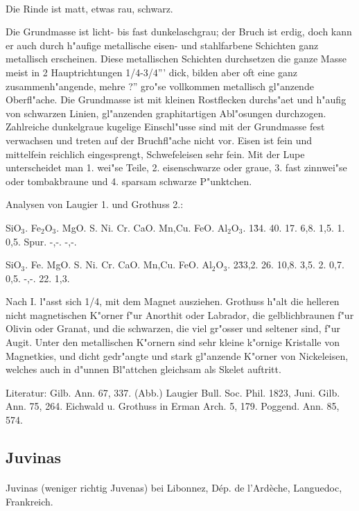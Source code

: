 \documentclass[a4paper, 11pt, oneside]{article}
\begin{document}
\paragraph{}
Die Rinde ist matt, etwas rau, schwarz.

Die Grundmasse ist licht- bis fast dunkelaschgrau; der Bruch ist erdig, doch kann er auch durch h"aufige metallische eisen- und stahlfarbene Schichten ganz metallisch erscheinen. Diese metallischen Schichten durchsetzen die ganze Masse meist in 2 Hauptrichtungen 1/4-3/4''' dick, bilden aber oft eine ganz zusammenh"angende, mehre ?'' gro"se vollkommen metallisch gl"anzende Oberfl"ache. Die Grundmasse ist mit kleinen Rostflecken durchs"aet und h"aufig von schwarzen Linien, gl"anzenden graphitartigen Abl"osungen durchzogen. Zahlreiche dunkelgraue kugelige Einschl"usse sind mit der Grundmasse fest verwachsen und treten auf der Bruchfl"ache nicht vor. Eisen ist fein und mittelfein reichlich eingesprengt, Schwefeleisen sehr fein. Mit der Lupe unterscheidet man 1. wei"se Teile, 2. eisenschwarze oder graue, 3. fast zinnwei"se oder tombakbraune und 4. sparsam schwarze P"unktchen.

Analysen von Laugier 1. und Grothuss 2.:

SiO$_{3}$. Fe$_{2}$O$_{3}$. MgO. S. Ni. Cr. CaO. Mn,Cu. FeO. Al$_{2}$O$_{3}$.  
1\. 34. 40. 17. 6,8. 1,5. 1. 0,5. Spur. -,-. -,-.  

SiO$_{3}$. Fe. MgO. S. Ni. Cr. CaO. Mn,Cu. FeO. Al$_{2}$O$_{3}$.  
2\. 33,2. 26. 10,8. 3,5. 2. 0,7. 0,5. -,-. 22. 1,3.

Nach I. l"asst sich 1/4, mit dem Magnet ausziehen. Grothuss h"alt die helleren nicht magnetischen K"orner f"ur Anorthit oder Labrador, die gelblichbraunen f"ur Olivin oder Granat, und die schwarzen, die viel gr"osser und seltener sind, f"ur Augit. Unter den metallischen K"ornern sind sehr kleine k"ornige Kristalle von Magnetkies, und dicht gedr"angte und stark gl"anzende K"orner von Nickeleisen, welches auch in d"unnen Bl"attchen gleichsam als Skelet auftritt.

Literatur: Gilb. Ann. 67, 337. (Abb.) Laugier Bull. Soc. Phil. 1823, Juni. Gilb. Ann. 75, 264. Eichwald u. Grothuss in Erman Arch. 5, 179. Poggend. Ann. 85, 574.

\subsection{Juvinas}
\normalsize
\paragraph{}
Juvinas (weniger richtig Juvenas) bei Libonnez, Dép. de l'Ardèche, Languedoc, Frankreich.
\end{document}
